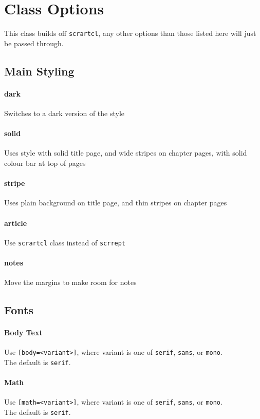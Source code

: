 \documentclass[solid,math,chem,code,plot]{bmc}
\begin{document}
\section{Class Options}

This class builds off \texttt{scrartcl},
any other options than those listed here will just be passed through.

\subsection{Main Styling}

\paragraph{\ttfamily dark}
Switches to a dark version of the style
\paragraph{\ttfamily solid}
Uses style with solid title page, and wide stripes on chapter pages, with solid colour bar at top of pages
\paragraph{\ttfamily stripe}
Uses plain background on title page, and thin stripes on chapter pages
\paragraph{\ttfamily article}
Use \texttt{scrartcl} class instead of \texttt{scrrept}
\paragraph{\ttfamily notes}
Move the margins to make room for notes

\subsection{Fonts}
\paragraph{Body Text}
Use \texttt{[body=<variant>]}, where variant is one of  \texttt{serif}, \texttt{sans}, or \texttt{mono}.
\\The default is \texttt{serif}.

\paragraph{Math}
Use \texttt{[math=<variant>]}, where variant is one of  \texttt{serif}, \texttt{sans}, or \texttt{mono}.
\\The default is \texttt{serif}.
\end{document}
